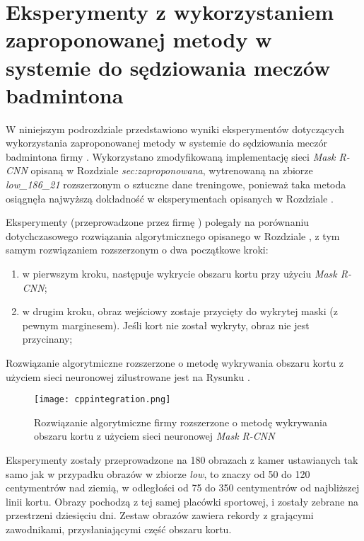 \section{Eksperymenty z wykorzystaniem zaproponowanej metody w systemie do sędziowania meczów badmintona}

W niniejszym podrozdziale przedstawiono wyniki eksperymentów dotyczących wykorzystania zaproponowanej metody w systemie do sędziowania meczór badmintona firmy \blue{}.
Wykorzystano zmodyfikowaną implementację sieci \textit{Mask R-CNN} opisaną w Rozdziale \textit{sec:zaproponowana}, wytrenowaną na zbiorze \textit{low\_186\_21} rozszerzonym o sztuczne dane treningowe, ponieważ taka metoda osiągnęła najwyższą dokładność w eksperymentach opisanych w Rozdziale .

Eksperymenty (przeprowadzone przez firmę \blue{}) polegały na porównaniu dotychczasowego rozwiązania algorytmicznego opisanego w Rozdziale , z tym samym rozwiązaniem rozszerzonym o dwa początkowe kroki:

\begin{enumerate}
  \item w pierwszym kroku, następuje wykrycie obszaru kortu przy użyciu \textit{Mask R-CNN};
  \item w drugim kroku, obraz wejściowy zostaje przycięty do wykrytej maski (z pewnym marginesem). Jeśli kort nie został wykryty, obraz nie jest przycinany;
\end{enumerate}

Rozwiązanie algorytmiczne rozszerzone o metodę wykrywania obszaru kortu z użyciem sieci neuronowej zilustrowane jest na Rysunku .

\begin{figure}[h]
  \centering
  \texttt{[image: cppintegration.png]}
  \caption{Rozwiązanie algorytmiczne firmy \blue{} rozszerzone o metodę wykrywania obszaru kortu z użyciem sieci neuronowej \textit{Mask R-CNN}}
  \label{fig:cppintegration}
\end{figure}

Eksperymenty zostały przeprowadzone na 180 obrazach z kamer ustawianych tak samo jak w przypadku obrazów w zbiorze \textit{low}, to znaczy od 50 do 120 centymentrów nad ziemią, w odległości od 75 do 350 centymentrów od najbliższej linii kortu. Obrazy pochodzą z tej samej placówki sportowej, i zostały zebrane na przestrzeni dziesięciu dni. Zestaw obrazów zawiera rekordy z grającymi zawodnikami, przysłaniającymi część obszaru kortu.

